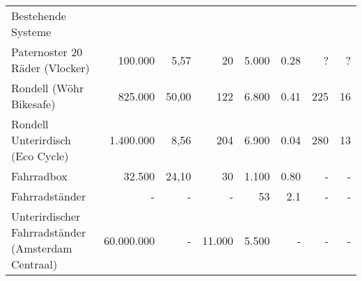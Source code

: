 \begin{longtable}{|p{}|r|r|r|r|r|r|r|}
  Bestehende Systeme                                                                                                                                                                                                                                                                                                                                                      \\
  Paternoster 20 Räder (Vlocker)                     & 100.000                                   & 5,57\cite{vlocker_fläche,parkplatz_größe} & 20\cite{vlocker_kapazität}          & 5.000\cite{vlocker_preis}                   & 0.28                                      & ?                                            & ?                                           \\
  Rondell (Wöhr Bikesafe)                            & 825.000\cite{richtpreisangebot}           & 50,00\cite{wöhr_fläche}                   & 122\cite{richtpreisangebot}         & 6.800                                       & 0.41                                      & 225                                          & 16\cite{wöhr_time}                          \\
  Rondell Unterirdisch (Eco Cycle)                   & 1.400.000\cite{ecocycle_cost}             & 8,56\cite{ecocycle_giken}                 & 204\cite{ecocycle_giken}            & 6.900                                       & 0.04                                      & 280                                          & 13\cite{ecocycle_specifications}            \\
  Fahrradbox                                         & 32.500\cite{box_angebot_orion}            & 24,10\cite{box_angebot_orion}             & 30\cite{box_angebot_orion}          & 1.100                                       & 0.80                                      & -                                            & -                                           \\
  Fahrradständer                                     & -                                         & -                                         & -                                   & 53\cite{ständer_preis}                      & 2.1\cite{leitfaden_vorarlberg}            & -                                            & -                                           \\
  Unterirdischer Fahrradständer (Amsterdam Centraal) & 60.000.000\cite{ständer_unter}            & -                                         & 11.000\cite{ständer_unter}          & 5.500                                       & -                                         & -                                            & -                                           \\


\end{longtable}
